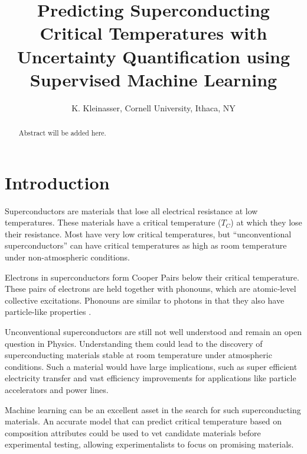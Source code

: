 \documentclass[twocolumn, nofootinbib, secnumarabic, amssymb, nobibnotes, aps, prd]{revtex4-2}
\begin{document}
%

\begin{abstract} %
Abstract will be added here.
\end{abstract}


\title{Predicting Superconducting Critical Temperatures with Uncertainty Quantification using Supervised Machine Learning}

\author{K. Kleinasser, Cornell University, Ithaca, NY}

\maketitle

\section{Introduction}
Superconductors are materials that lose all electrical resistance at low temperatures. These materials have a critical temperature ($T_C$) at which they lose their resistance. Most have very low critical temperatures, but “unconventional superconductors” can have critical temperatures as high as room temperature under non-atmospheric conditions. 

Electrons in superconductors form Cooper Pairs below their critical temperature. These pairs of electrons are held together with phonouns, which are atomic-level collective excitations. Phonouns are similar to photons in that they also have particle-like properties \cite{rohlf_1994}.

Unconventional superconductors are still not well understood and remain an open question in Physics. Understanding them could lead to the discovery of superconducting materials stable at room temperature under atmospheric conditions. Such a material would have large implications, such as super efficient electricity transfer and vast efficiency improvements for applications like particle accelerators and power lines.

Machine learning can be an excellent asset in the search for such superconducting materials. An accurate model that can predict critical temperature based on composition attributes could be used to vet candidate materials before experimental testing, allowing experimentalists to focus on promising materials. 
\end{document}

